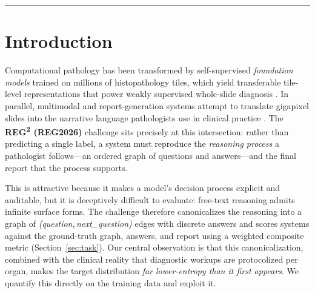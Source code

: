 \documentclass[11pt,a4paper]{article}
\begin{document}
\begin{abstract}
training slides, almost all prostate, are striped-Deflate TIFFs that OpenSlide cannot read and
that had silently trained as zero-vectors---with a bounded random-access strip decoder that also
makes the deployment container safe against out-of-memory failure on gigapixel slides. On the
official REG2026 \textbf{Test Phase~1} leaderboard the CONCH-only submission scored
\textbf{0.7449} and the fusion submission \textbf{0.7707} (both top-10), with every
diagnosis-driven component (Edge-F1, MESS, Report) rising and the grounding components unchanged,
exactly as the held-out analysis predicts. We detail the data analysis, both architectures,
high-performance-computing infrastructure (Blackwell-class GPUs, CUDA~12.8/PyTorch~2.9), training
methodology, and qualitative predictions, and release all code with reproduction instructions.
\end{abstract}

\tableofcontents
\vspace{6pt}\hrule

\section{Introduction}
\label{sec:intro}

Computational pathology has been transformed by self-supervised \emph{foundation models}
trained on millions of histopathology tiles, which yield transferable tile-level
representations that power weakly supervised whole-slide diagnosis
\cite{chen2024uni,lu2024conch,xu2024provgigapath,vorontsov2024virchow}. In parallel,
multimodal and report-generation systems attempt to translate gigapixel slides into the
narrative language pathologists use in clinical practice \cite{tu2024histgen}. The
\textbf{REG\textsuperscript{2} (REG2026)} challenge sits precisely at this intersection: rather
than predicting a single label, a system must reproduce the \emph{reasoning process} a
pathologist follows---an ordered graph of questions and answers---and the final report that
the process supports.

This is attractive because it makes a model's decision process explicit and auditable, but it
is deceptively difficult to evaluate: free-text reasoning admits infinite surface forms. The
challenge therefore canonicalizes the reasoning into a graph of
\emph{(question,\,next\_question)} edges with discrete answers and scores systems against the
ground-truth graph, answers, and report using a weighted composite metric
(Section~\ref{sec:task}). Our central observation is that this canonicalization, combined with
the clinical reality that diagnostic workups are protocolized per organ, makes the target
distribution \emph{far lower-entropy than it first appears}. We quantify this directly on the
training data and exploit it.
\end{document}

